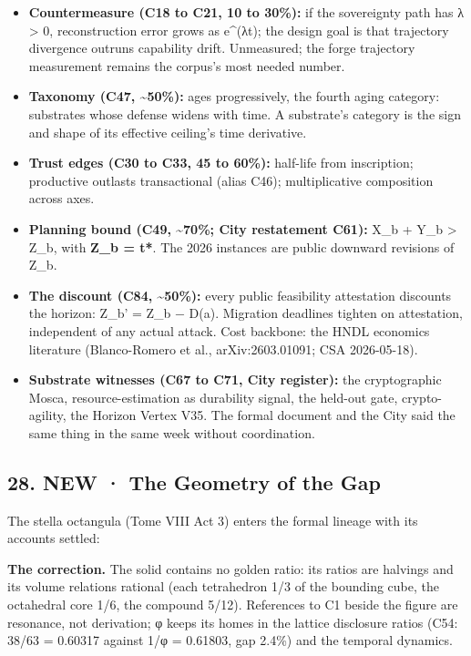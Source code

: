 \documentclass[
  11pt,
]{article}
\providecommand{\tightlist}{%
  \setlength{\itemsep}{0pt}\setlength{\parskip}{0pt}}
\begin{document}
\begin{itemize}
\tightlist
\item
  \textbf{Countermeasure (C18 to C21, 10 to 30\%):} if the sovereignty
  path has λ \textgreater{} 0, reconstruction error grows as e\^{}(λt);
  the design goal is that trajectory divergence outruns capability
  drift. Unmeasured; the forge trajectory measurement remains the
  corpus's most needed number.
\item
  \textbf{Taxonomy (C47, \textasciitilde50\%):} ages progressively, the
  fourth aging category: substrates whose defense widens with time. A
  substrate's category is the sign and shape of its effective ceiling's
  time derivative.
\item
  \textbf{Trust edges (C30 to C33, 45 to 60\%):} half-life from
  inscription; productive outlasts transactional (alias C46);
  multiplicative composition across axes.
\item
  \textbf{Planning bound (C49, \textasciitilde70\%; City restatement
  C61):} X\_b + Y\_b \textgreater{} Z\_b, with \textbf{Z\_b = t*}. The
  2026 instances are public downward revisions of Z\_b.
\item
  \textbf{The discount (C84, \textasciitilde50\%):} every public
  feasibility attestation discounts the horizon: Z\_b' = Z\_b − D(a).
  Migration deadlines tighten on attestation, independent of any actual
  attack. Cost backbone: the HNDL economics literature (Blanco-Romero et
  al., arXiv:2603.01091; CSA 2026-05-18).
\item
  \textbf{Substrate witnesses (C67 to C71, City register):} the
  cryptographic Mosca, resource-estimation as durability signal, the
  held-out gate, crypto-agility, the Horizon Vertex V35. The formal
  document and the City said the same thing in the same week without
  coordination.
\end{itemize}

\subsection{28. NEW · The Geometry of the
Gap}\label{new-the-geometry-of-the-gap}

The stella octangula (Tome VIII Act 3) enters the formal lineage with
its accounts settled:

\textbf{The correction.} The solid contains no golden ratio: its ratios
are halvings and its volume relations rational (each tetrahedron 1/3 of
the bounding cube, the octahedral core 1/6, the compound 5/12).
References to C1 beside the figure are resonance, not derivation; φ
keeps its homes in the lattice disclosure ratios (C54: 38/63 = 0.60317
against 1/φ = 0.61803, gap 2.4\%) and the temporal dynamics.
\end{document}
